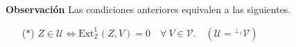 \documentclass[preview]{standalone}
\begin{document}
\begin{center}
\justifying \textbf{Observación} Las condiciones anteriores equivalen a las siguientes.\begin{itemize} \item[($\ast$)] $Z\in\mathcal{U} \iff \text{Ext}^1_\mathbb{Z}(Z,V) = 0 \quad \forall \ V\in\mathcal{V}. \quad (\mathcal{U} = {}^{\perp_1}\mathcal{V})$\end{itemize}
\end{center}
\end{document}
